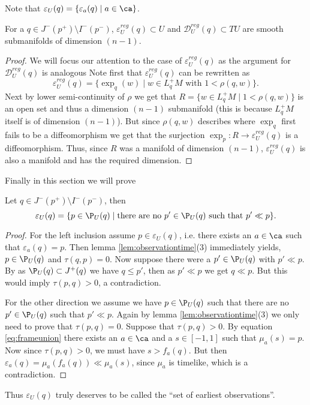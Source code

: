 Note that $\varepsilon_U(q) = \{ \varepsilon_a(q) \mid a\in \ca \}$.

\begin{proposition} For a $q\in J^-(p^+)\setminus I^-(p^-)$, $\varepsilon^{reg}_U(q)\subset U$ and $\mathcal{D}^{reg}_U(q)\subset TU$ are smooth submanifolds of dimension $(n-1)$.
\end{proposition}
\begin{proof}
We will focus our attention to the case of $\varepsilon^{reg}_U(q)$ as the argument for  $\mathcal{D}^{reg}_U(q)$ is analogous
Note first that $\varepsilon^{reg}_U(q)$ can be rewritten as 
\[
   \varepsilon^{reg}_U(q) = \{\exp_q(w) \mid  w\in L^+_qM \text{ with } 1<\rho(q,w)\}.
\]
Next by lower semi-continuity of $\rho$ we get that $R=\{w\in L^+_qM \mid 1<\rho(q,w)\}$ is an open set and thus a dimension $(n-1)$ submanifold (this is because $L^+_qM$ itself is of dimension $(n-1)$). But since $\rho(q,w)$ describes where $\exp_q$ first fails to be a diffeomorphism we get that the surjection $\exp_p:R\to \varepsilon^{reg}_U(q)$ is a diffeomorphism. Thus, since $R$ was a manifold of dimension $(n-1)$, $\varepsilon^{reg}_U(q)$ is also a manifold and has the required dimension.
\end{proof}

Finally in this section we will prove
\begin{proposition}\label{prop:seocharact}
Let $q\in J^-(p^+)\setminus I^-(p^-)$, then 
\begin{equation*}
    \varepsilon_U(q) = \{ p \in \P_U(q) \mid \text{there are no $p'\in \P_U(q)$ such that $p'\ll p$} \}.
\end{equation*}
\end{proposition}
\begin{proof}
For the left inclusion assume $p\in \varepsilon_U(q)$, i.e. there exists an $a\in \ca$ such that $\varepsilon_a(q)=p$. Then lemma \ref{lem:observationtime}(3) immediately yields, $p\in \P_U(q)$ and  $\tau(q,p)=0$. Now suppose there were a $p'\in \P_U(q)$ with $p'\ll p$. By as $\P_U(q)\subset J^+(q)$ we have $q\leq p'$, then as $p'\ll p$ we get $q\ll p$. But this would imply $\tau(p,q)>0$, a contradiction.

For the other direction we assume we have $p \in \P_U(q)$ such that there are no $p'\in\P_U(q)$ such that $p'\ll p$. Again by lemma \ref{lem:observationtime}(3) we only need to prove that $\tau(p,q)=0$. Suppose that $\tau(p,q)>0$. By equation \eqref{eq:frameunion} there exists an $a\in \ca$ and a $s\in [-1,1]$ such that $\mu_a(s) = p$. Now since $\tau(p,q)>0$, we must have $s > f_a(q)$. But then $\varepsilon_a(q) = \mu_a(f_a(q)) \ll  \mu_a(s)$, since $\mu_a$ is timelike, which is a contradiction.
\end{proof}
Thus $\varepsilon_U(q)$ truly deserves to be called the \enquote{set of earliest observations}.

